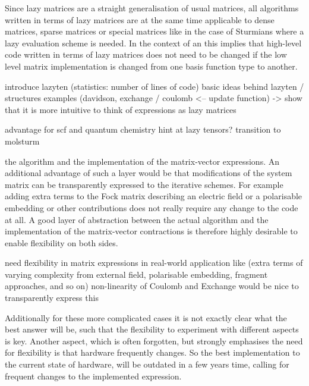 Since lazy matrices are a straight generalisation of usual matrices,
all algorithms written in terms of lazy matrices
are at the same time applicable to dense matrices,
sparse matrices or special matrices like in the case of Sturmians
where a lazy evaluation scheme is needed.
In the context of an \SCF this implies that high-level code
written in terms of lazy matrices
does not need to be changed if the low level matrix implementation
is changed from one basis function type to another.





introduce lazyten (statistics: number of lines of code)
basic ideas behind lazyten / structures
examples (davidson, exchange / coulomb <-- update function)
-> show that it is more intuitive to think of \contraction expressions as lazy matrices

advantage for scf and quantum chemistry
hint at lazy tensors?
transition to molsturm



the \SCF algorithm
and the implementation of the matrix-vector \contraction expressions.
An additional advantage of such a layer would be that
modifications of the system matrix can be transparently expressed
to the iterative schemes.
For example adding extra terms to the Fock matrix
describing an electric field or a polarisable embedding
or other contributions does not really require
any change to the \SCF code at all.
A good layer of abstraction between the actual \SCF algorithm
and the implementation of the matrix-vector contractions
is therefore highly desirable to enable flexibility on both sides.

need flexibility in matrix expressions in real-world application
like \SCF (extra terms of varying complexity from external field,
polarisable embedding, fragment approaches, and so on)
non-linearity of Coulomb and Exchange
would be nice to transparently express this


Additionally for these more complicated cases
it is not exactly clear what the best answer will be,
such that the flexibility to experiment with different aspects is key.
Another aspect, which is often forgotten,
but strongly emphasises the need for flexibility
is that hardware frequently changes.
So the best implementation to the current state of hardware,
will be outdated in a few years time,
calling for frequent changes to the implemented \contraction expression.

